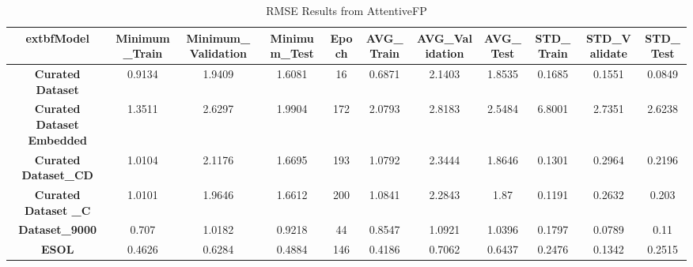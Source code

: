 ﻿\begin{table}[!ht]
    \centering
    \begin{tabular}{|c|c|c|c|c|c|c|c|c|c|c|}
    \hline
        	extbf{Model} & \textbf{Minimum\_Train} & \textbf{Minimum\_Validation} & \textbf{Minimum\_Test} & \textbf{Epoch} & \textbf{AVG\_Train} & \textbf{AVG\_Validation} & \textbf{AVG\_Test} & \textbf{STD\_Train} & \textbf{STD\_Validate} & \textbf{STD\_Test} \\ \hline
        \textbf{Curated Dataset} & 0.9134 & 1.9409 & 1.6081 & 16 & 0.6871 & 2.1403 & 1.8535 & 0.1685 & 0.1551 & 0.0849 \\ \hline
        \textbf{Curated Dataset Embedded} & 1.3511 & 2.6297 & 1.9904 & 172 & 2.0793 & 2.8183 & 2.5484 & 6.8001 & 2.7351 & 2.6238 \\ \hline
        \textbf{Curated Dataset\_CD} & 1.0104 & 2.1176 & 1.6695 & 193 & 1.0792 & 2.3444 & 1.8646 & 0.1301 & 0.2964 & 0.2196 \\ \hline
        \textbf{Curated Dataset \_C} & 1.0101 & 1.9646 & 1.6612 & 200 & 1.0841 & 2.2843 & 1.87 & 0.1191 & 0.2632 & 0.203 \\ \hline
        \textbf{Dataset\_9000} & 0.707 & 1.0182 & 0.9218 & 44 & 0.8547 & 1.0921 & 1.0396 & 0.1797 & 0.0789 & 0.11 \\ \hline
        \textbf{ESOL} & 0.4626 & 0.6284 & 0.4884 & 146 & 0.4186 & 0.7062 & 0.6437 & 0.2476 & 0.1342 & 0.2515 \\ \hline
    \end{tabular}
    \caption{RMSE Results from AttentiveFP}
\end{table}
